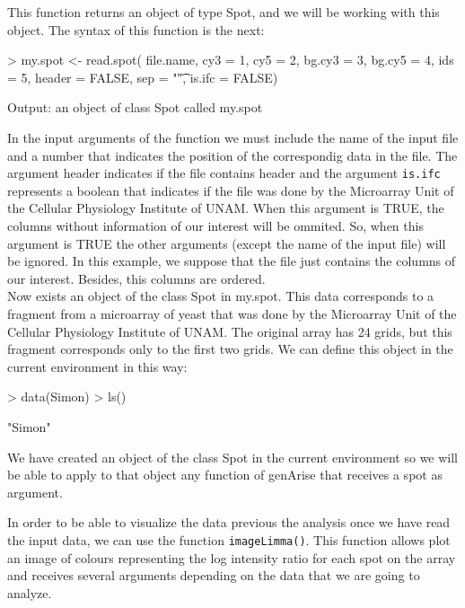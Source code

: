 \documentclass[12pt]{article}
\begin{document}
This function returns an object of type Spot, and we will be working with this object. The syntax of this function is the next:

\begin{Scode}
> my.spot <- read.spot( file.name, cy3 = 1, cy5 = 2, 
  bg.cy3 = 3, bg.cy5 = 4, ids = 5, header = FALSE, 
  sep = "\t", is.ifc = FALSE)	
\end{Scode}

\begin{Soutput}
Output: an object of class Spot called my.spot
\end{Soutput}

In the input arguments of the function we must include the name of the input file and a number that indicates the position of the correspondig data in the file. The argument header indicates if the file contains header and the argument \texttt{is.ifc} represents a boolean that indicates if the file was done by the Microarray Unit of the Cellular Physiology Institute of UNAM. When this argument is TRUE, the columns without information of our interest will be ommited. So, when this argument is TRUE the other arguments (except the name of the input file) will be ignored. In this example, we suppose that the file just contains the columns of our interest. Besides, this columns are ordered.\\


Now exists an object of the class Spot in my.spot. This data corresponds to a fragment from a microarray of yeast that was done by the Microarray Unit of the Cellular Physiology Institute of UNAM. The original array has 24 grids, but this fragment corresponds only to the first two grids. We can define this object in the current environment in this way:

\begin{Schunk}
\begin{Sinput}
> data(Simon)
> ls()
\end{Sinput}
\begin{Soutput}
[1] "Simon"
\end{Soutput}
\end{Schunk}

\begin{Soutput}
We have created an object of the class Spot in the current
environment so we will be able to apply to that object any 
function of genArise that receives a spot as argument.
\end{Soutput}

In order to be able to visualize the data previous the analysis once we have read the input data, we can use the function \texttt{imageLimma()}. This function allows plot an image of colours representing the log intensity ratio for each  spot on the array and receives several arguments depending on the data that we are going to analyze.
\pagebreak
\end{document}
